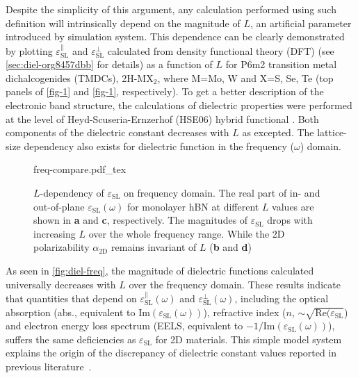 %
%
Despite  the simplicity of this argument, any calculation performed
using such definition will intrinsically depend on the magnitude of
$L$, an artificial parameter introduced by simulation system. This
dependence can be clearly demonstrated by plotting
$\varepsilon^{\parallel}_{\mathrm{SL}}$ and
$\varepsilon^{\perp}_{\mathrm{SL}}$ calculated from density functional
theory (DFT) (see \autoref{sec:diel-org8457dbb} for details) as a
function of $L$ for P$\overline{6}$m2 transition metal dichalcogenides
(TMDCs), 2H-MX$_{2}$, where M=Mo, W and X=S, Se, Te (top panels of
\autoref{fig-1} and \autoref{fig-1}, respectively). To get
a better description of the electronic band structure, the
calculations of dielectric properties were performed at the level of
Heyd-Scuseria-Ernzerhof (HSE06) hybrid functional
\autocite{Heyd_2003_HSe,HSE_2006_erratum}.  Both components of the
dielectric constant decreases with $L$ as excepted.  The lattice-size
dependency also exists for dielectric function in the frequency
($\omega$) domain. 
\begin{figure}[!htbp]
\centering
{freq-compare.pdf_tex}
\caption{\label{fig:diel-freq}
  $L$-dependency of $\varepsilon_{\mathrm{SL}}$ on frequency
  domain. The real part of in- and out-of-plane
  $\varepsilon_{\mathrm{SL}}(\omega)$ for monolayer hBN at different
  $L$ values are shown in \textbf{a} and \textbf{c}, respectively. The
  magnitudes of $\varepsilon_{\mathrm{SL}}$ drops with increasing $L$
  over the whole frequency range. While the 2D polarizability
  $\alpha_{\mathrm{2D}}$ remains invariant of $L$ (\textbf{b} and
  \textbf{d})}
\end{figure}
%
As seen in \autoref{fig:diel-freq}, the magnitude of dielectric
functions calculated universally decreases with $L$ over the frequency
domain.  These results indicate that quantities that depend on
$\varepsilon^{\parallel}_{\mathrm{SL}}(\omega)$ and
$\varepsilon^{\perp}_{\mathrm{SL}}(\omega)$, including the optical
absorption (abs., equivalent to
$\mathrm{Im}(\varepsilon_{\mathrm{SL}}(\omega))$), refractive index
($n$, $\sim{}\sqrt{\mathrm{Re}(\varepsilon_{\mathrm{SL}}}$) and
electron energy loss spectrum (EELS, equivalent to
$-1 / \mathrm{Im}(\varepsilon_{\mathrm{SL}}(\omega))$), suffers the
same deficiencies as $\varepsilon_{\mathrm{SL}}$ for 2D
materials. This simple model system explains the origin of the
discrepancy of dielectric constant values reported in previous
literature~\autocite{Li_2016_screening_rev}.
%
%
%
%
%

